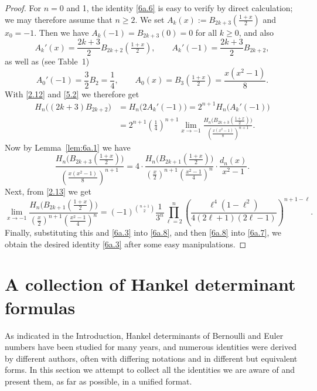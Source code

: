\documentclass{amsart}
\theoremstyle{plain}
\numberwithin{equation}{section}
\begin{document}
\begin{proof}
For $n=0$ and 1, the identity \eqref{6a.6} is easy to verify by direct 
calculation; we may therefore assume that $n\geq 2$.
We set $A_k(x):=B_{2k+3}(\frac{1+x}{2})$ and $x_0=-1$. Then we have 
$A_k(-1)=B_{2k+3}(0)=0$ for all $k\geq 0$, and also
\[
A_k'(x)=\frac{2k+3}{2}B_{2k+2}(\tfrac{1+x}{2}),\qquad
A_k'(-1)=\frac{2k+3}{2}B_{2k+2},
\]
as well as (see Table~1)
\[
A_0'(-1)=\frac{3}{2}B_2=\frac{1}{4},\qquad
A_0(x)=B_3(\tfrac{1+x}{2})=\frac{x(x^2-1)}{8}.
\]
With \eqref{2.12} and \eqref{5.2} we therefore get
\begin{align}
H_n\big((2k+3)B_{2k+2}\big) 
&= H_n\big(2A_k'(-1)\big) = 2^{n+1}H_n\big(A_k'(-1)\big)\label{6a.7} \\
&= 2^{n+1}\left(\tfrac{1}{4}\right)^{n+1}
\lim_{x\to-1}\frac{H_n\big(B_{2k+3}(\frac{1+x}{2})\big)}
{\left(\frac{x(x^2-1)}{8}\right)^{n+1}}. \nonumber
\end{align}
Now by Lemma~\ref{lem:6a.1} we have
\begin{equation}\label{6a.8}
\frac{H_n\big(B_{2k+3}(\frac{1+x}{2})\big)}{\left(\frac{x(x^2-1)}{8}\right)^{n+1}}
=4\cdot\frac{H_n\big(B_{2k+1}(\frac{1+x}{2})\big)}
{\left(\frac{x}{2}\right)^{n+1}\left(\frac{x^2-1}{4}\right)^n}
\cdot\frac{d_n(x)}{x^2-1}.
\end{equation}
Next, from \eqref{2.13} we get
\[
\lim_{x\to-1}\frac{H_n\big(B_{2k+1}(\frac{1+x}{2})\big)}
{\left(\frac{x}{2}\right)^{n+1}\left(\frac{x^2-1}{4}\right)^n}
= (-1)^{\binom{n+1}{2}}\frac{1}{3^n}\prod_{\ell=2}^{n}
\left(\frac{\ell^{4}(1-\ell^{2})}{4(2\ell+1)(2\ell-1)}\right)^{n+1-\ell}.
\]
Finally, substituting this and \eqref{6a.3} into \eqref{6a.8}, and then
\eqref{6a.8} into \eqref{6a.7}, we obtain the desired identity \eqref{6a.3}
after some easy manipulations.
\end{proof}

\section{A collection of Hankel determinant formulas}

As indicated in the Introduction, Hankel determinants of Bernoulli and Euler
numbers have been studied for many years, and numerous identities were derived
by different authors, often with differing notations and in different but
equivalent forms. In this section we attempt to collect all the identities we
are aware of and present them, as far as possible, in a unified format.
\end{document}

